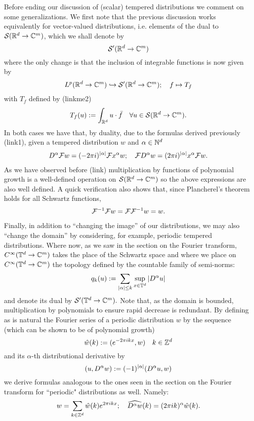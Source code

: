 \documentclass[12pt]{article}
\begin{document}
Before ending our discussion of (scalar) tempered distributions we comment on some generalizations. We first note that the previous discussion works equivalently for vector-valued distributions, i.e. elements of the dual to $\mathcal{S}({\mathbb R}^d\to\mathbb{C}^m)$, which we shall denote by\[\mathcal{S}'({\mathbb R}^d\to\mathbb{C}^m)\]
where the only change is that the inclusion of integrable functions is now given by
\begin{align}\label{lpisvectordistr}
	L^p({\mathbb R}^d\to\mathbb{C}^m)\hookrightarrow{\mathcal S}'({\mathbb R}^d\to\mathbb{C}^m);\quad f\mapsto T_f
\end{align}
with $T_f$ defined by (linkme2)
\[T_f(u):=\int_{{\mathbb R}^d} u\cdot \bar{f}\quad\forall{u}\in {{\mathcal S}({\mathbb R}^d\to\mathbb{C}^m)}.\]
In both cases we have that, by duality, due to the formulas derived previously (link1), given a tempered distribution $w$ and $\alpha\in \mathbb{N}^d$
\begin{align}\label{derivativedistronperiodic}
	D^\alpha\mathcal{F} w =(-2\pi i)^{\abs{\alpha}}\mathcal{F} x^\alpha w;\quad
	\mathcal{F} D^{\alpha} w= (2\pi i)^{\abs{\alpha}}x^\alpha\mathcal{F} w.
\end{align}
As we have observed before (link) multiplication by functions of polynomial growth is a well-defined operation on ${\mathcal S}({\mathbb R}^d\to\mathbb{C}^m)$ so the above expressions are also well defined. A quick verification also shows that, since Plancherel's theorem holds for all Schwartz functions,
\begin{equation}\label{planchereldistr}
	\mathcal{F}^{-1}\mathcal{F} w=\mathcal{F}\mathcal{F}^{-1}w=w.
\end{equation}

Finally, in addition to ``changing the image'' of our distributions, we may also ``change the domain'' by considering, for example, periodic tempered distributions. Where now, as we saw in the section on the Fourier transform, $C^\infty({\mathbb T}^d\to\mathbb{C}^m)$ takes the place of the Schwartz space and where we place on $C^\infty({\mathbb T}^d\to\mathbb{C}^m)$ the topology defined by the countable family of semi-norms:
\[q_k(u):=\sum_{\abs{\alpha}\leq k}\sup_{x\in{\mathbb T}^d}\abs{D^\alpha u}\]
and denote its dual by ${\mathcal S}'({\mathbb T}^d\to\mathbb{C}^m).$ Note that, as the domain is bounded, multiplication by polynomials to ensure rapid decrease is redundant.
By defining as is natural the Fourier series of a periodic distribution $w$ by the sequence (which can be shown to be of polynomial growth)
\begin{equation}\label{fouriercoeffperiodicdist}
	\hat{w}(k):=(e^{-2\pi ikx},w)\quad k\in{\mathbb Z}^d
\end{equation}
and its $\alpha$-th distributional derivative by
\[(u,D^\alpha w):=(-1)^\abs{\alpha}(D^\alpha u,w)\]
we derive formulas analogous to the ones seen in the section on the Fourier transform for ``periodic" distributions as well. Namely:
\begin{equation}\label{derivativedistr}
	w=\sum_{k\in{\mathbb Z}^d}\hat{w}(k)e^{2\pi i k x};\quad\widehat{D^\alpha w}(k)=(2\pi ik)^\alpha\hat{w}(k).
\end{equation}
\end{document}
